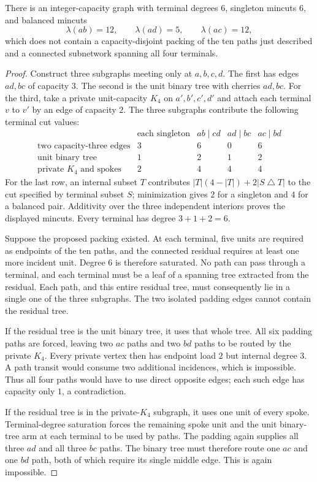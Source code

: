 \begin{proposition}
\label{prop:residual-packing-counterexample}
There is an integer-capacity graph with terminal degrees $6$,
singleton mincuts $6$, and balanced mincuts
\[
 \lambda(ab)=12,\qquad \lambda(ad)=5,\qquad \lambda(ac)=12,
\]
which does not contain a capacity-disjoint packing of the ten
paths just described and a connected subnetwork spanning all
four terminals.
\end{proposition}

\begin{proof}
Construct three subgraphs meeting only at $a,b,c,d$.
The first has edges $ad,bc$ of capacity $3$.
The second is the unit binary tree with cherries $ad,bc$.
For the third, take a private unit-capacity $K_4$ on
$a',b',c',d'$ and attach each terminal $v$ to $v'$ by an
edge of capacity $2$.  The three subgraphs contribute the
following terminal cut values:
\[
\begin{array}{c|cccc}
 &\text{each singleton}&ab\mid cd&ad\mid bc&ac\mid bd\\\hline
 \text{two capacity-three edges}&3&6&0&6\\
 \text{unit binary tree}&1&2&1&2\\
 \text{private }K_4\text{ and spokes}&2&4&4&4
\end{array}
\]
For the last row, an internal subset $T$ contributes
$|T|(4-|T|)+2|S\mathbin{\triangle}T|$ to the cut specified
by terminal subset $S$; minimization gives $2$ for a
singleton and $4$ for a balanced pair.  Additivity over
the three independent interiors proves the displayed
mincuts.  Every terminal has degree $3+1+2=6$.

Suppose the proposed packing existed.  At each terminal,
five units are required as endpoints of the ten paths, and
the connected residual requires at least one more incident
unit.  Degree $6$ is therefore saturated.  No path can pass
through a terminal, and each terminal must be a leaf of a
spanning tree extracted from the residual.  Each path, and
this entire residual tree, must consequently lie in a single
one of the three subgraphs.  The two isolated padding edges
cannot contain the residual tree.

If the residual tree is the unit binary tree, it uses that
whole tree.  All six padding paths are forced, leaving two
$ac$ paths and two $bd$ paths to be routed by the private
$K_4$.  Every private vertex then has endpoint load $2$
but internal degree $3$.  A path transit would consume two
additional incidences, which is impossible.  Thus all four
paths would have to use direct opposite edges; each such
edge has capacity only $1$, a contradiction.

If the residual tree is in the private-$K_4$ subgraph, it
uses one unit of every spoke.  Terminal-degree saturation
forces the remaining spoke unit and the unit binary-tree
arm at each terminal to be used by paths.  The padding
again supplies all three $ad$ and all three $bc$ paths.
The binary tree must therefore route one $ac$ and one $bd$
path, both of which require its single middle edge.  This
is again impossible.
\end{proof}

